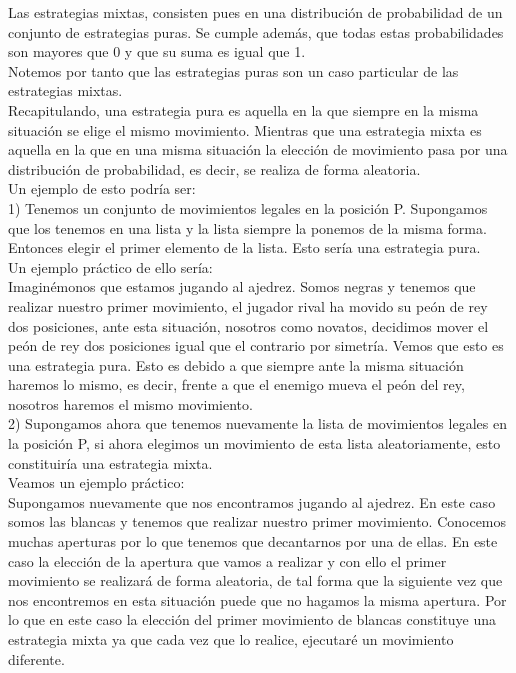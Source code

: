 \documentclass[10pt,a4paper]{book}
\begin{document}
Las estrategias mixtas, consisten pues en una distribución de probabilidad de un conjunto de estrategias puras. Se cumple además, que todas estas probabilidades son mayores que 0 y que su suma es igual que 1.\\

Notemos por tanto que las estrategias puras son un caso particular de las estrategias mixtas.\\

Recapitulando, una estrategia pura es aquella en la que siempre en la misma situación se elige el mismo movimiento. Mientras que una estrategia mixta es aquella en la que en una misma situación la elección de movimiento pasa por una distribución de probabilidad, es decir, se realiza de forma aleatoria.\\

Un ejemplo de esto podría ser:\\
1) Tenemos un conjunto de movimientos legales en la posición P. Supongamos que los tenemos en una lista y la lista siempre la ponemos de la misma forma. Entonces elegir el primer elemento de la lista. Esto sería una estrategia pura.\\
Un ejemplo práctico de ello sería:\\
Imaginémonos que estamos jugando al ajedrez. Somos negras y tenemos que realizar nuestro primer movimiento, el jugador rival ha movido su peón de rey dos posiciones, ante esta situación, nosotros como novatos, decidimos mover el peón de rey dos posiciones igual que el contrario por simetría. Vemos que esto es una estrategia pura. Esto es debido a que siempre ante la misma situación haremos lo mismo, es decir, frente a que el enemigo mueva el peón del rey, nosotros haremos el mismo movimiento.\\

2) Supongamos ahora que tenemos nuevamente la lista de movimientos legales en la posición P, si ahora elegimos un movimiento de esta lista aleatoriamente, esto constituiría una estrategia mixta.\\

Veamos un ejemplo práctico:\\

Supongamos nuevamente que nos encontramos jugando al ajedrez. En este caso somos las blancas y tenemos que realizar nuestro primer movimiento. Conocemos muchas aperturas por lo que tenemos que decantarnos por una de ellas. En este caso la elección de la apertura que vamos a realizar y con ello el primer movimiento se realizará de forma aleatoria, de tal forma que la siguiente vez que nos encontremos en esta situación puede que no hagamos la misma apertura. Por lo que  en este caso la elección del primer movimiento de blancas constituye una estrategia mixta ya que cada vez que lo realice, ejecutaré un movimiento diferente.\\
\end{document}

